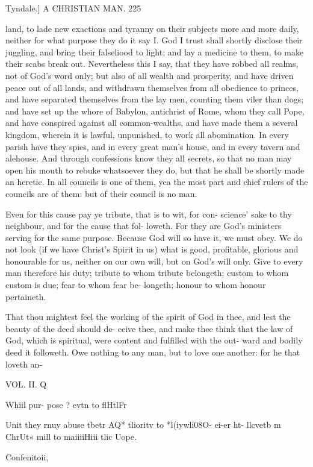 \documentclass{custom}
\begin{document}
{Tyndale.]
A CHRISTIAN MAN.
225 

land, to lade new exactions and tyranny on their subjects 
more and more daily, neither for what purpose they do it 
say I. God I trust shall shortly disclose their juggling, 
and bring their falseliood to light; and lay a medicine to 
them, to make their scabs break out. Nevertheless this I 
say, that they have robbed all realms, not of God's word 
only; but also of all wealth and prosperity, and have driven 
peace out of all lands, and withdrawn themselves from all 
obedience to princes, and have separated themselves from 
the lay men, counting them viler than dogs; and have set 
up the whore of Babylon, antichrist of Rome, whom they 
call Pope, and have conspired against all common-wealths, 
and have made them a several kingdom, wherein it is 
lawful, unpunished, to work all abomination. In every 
parish have they spies, and in every great man's house, and 
in every tavern and alehouse. And through confessions 
know they all secrets, so that no man may open his mouth 
to rebuke whatsoever they do, but that he shall be shortly 
made an heretic. In all councils is one of them, yea the 
most part and chief rulers of the councils are of them:
but of their council is no man. 

Even for this cause pay ye tribute, that is to wit, for con- 
science' sake to thy neighbour, and for the cause that fol- 
loweth. For they are God's ministers serving for the same 
purpose. Because God will so have it, we must obey. 
We do not look (if we have Christ's Spirit in us) what is 
good, profitable, glorious and honourable for us, neither 
on our own will, but on God's will only. Give to every 
man therefore his duty; tribute to whom tribute belongeth;
custom to whom custom is due; fear to whom fear be- 
longeth; honour to whom honour pertaineth. 

That thou mightest feel the working of the spirit of 
God in thee, and lest the beauty of the deed should de- 
ceive thee, and make thee think that the law of God, 
which is spiritual, were content and fulfilled with the out- 
ward and bodily deed it followeth. Owe nothing to any 
man, but to love one another: for he that loveth an- 

VOL. II. Q 

Whiil pur- 
pose ? evtn 
to flHtlFr 

Unit they 
rnuy abuse 
tbetr AQ* 
tlioritv to 
*l(iywli08O- 
ei-er ht- 
llcvetb m 
ChrUt« mill 
to maiiiiHiii 
tlic Uope. 

Confenitoii, 

}
\end{document}

